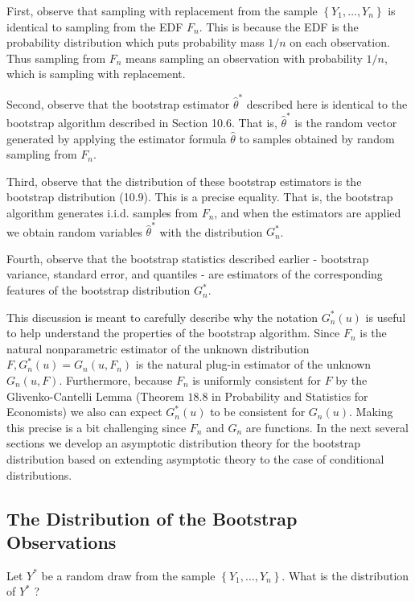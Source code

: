 \documentclass[10pt]{article}
\begin{document}
First, observe that sampling with replacement from the sample $\left\{Y_{1}, \ldots, Y_{n}\right\}$ is identical to sampling from the EDF $F_{n}$. This is because the EDF is the probability distribution which puts probability mass $1 / n$ on each observation. Thus sampling from $F_{n}$ means sampling an observation with probability $1 / n$, which is sampling with replacement.

Second, observe that the bootstrap estimator $\widehat{\theta}^{*}$ described here is identical to the bootstrap algorithm described in Section 10.6. That is, $\widehat{\theta}^{*}$ is the random vector generated by applying the estimator formula $\widehat{\theta}$ to samples obtained by random sampling from $F_{n}$.

Third, observe that the distribution of these bootstrap estimators is the bootstrap distribution (10.9). This is a precise equality. That is, the bootstrap algorithm generates i.i.d. samples from $F_{n}$, and when the estimators are applied we obtain random variables $\widehat{\theta}^{*}$ with the distribution $G_{n}^{*}$.

Fourth, observe that the bootstrap statistics described earlier - bootstrap variance, standard error, and quantiles - are estimators of the corresponding features of the bootstrap distribution $G_{n}^{*}$.

This discussion is meant to carefully describe why the notation $G_{n}^{*}(u)$ is useful to help understand the properties of the bootstrap algorithm. Since $F_{n}$ is the natural nonparametric estimator of the unknown distribution $F, G_{n}^{*}(u)=G_{n}\left(u, F_{n}\right)$ is the natural plug-in estimator of the unknown $G_{n}(u, F)$. Furthermore, because $F_{n}$ is uniformly consistent for $F$ by the Glivenko-Cantelli Lemma (Theorem $18.8$ in Probability and Statistics for Economists) we also can expect $G_{n}^{*}(u)$ to be consistent for $G_{n}(u)$. Making this precise is a bit challenging since $F_{n}$ and $G_{n}$ are functions. In the next several sections we develop an asymptotic distribution theory for the bootstrap distribution based on extending asymptotic theory to the case of conditional distributions.

\subsection{The Distribution of the Bootstrap Observations}
Let $Y^{*}$ be a random draw from the sample $\left\{Y_{1}, \ldots, Y_{n}\right\}$. What is the distribution of $Y^{*}$ ?
\end{document}
